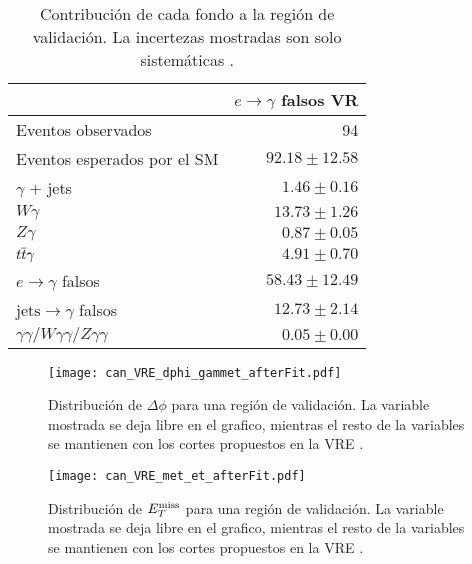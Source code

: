 \begin{table}
\centering
\caption{Contribución de cada fondo a la región de validación. La incertezas mostradas son solo sistemáticas \cite{drfran}.}
\begin{tabular}{lr}
\hline
 & $e\to\gamma$ falsos VR \\
\hline
Eventos observados & 94 \\
\hline
Eventos esperados por el SM & $92.18 \pm 12.58$ \\
\hline
$\gamma$ + jets & $1.46 \pm 0.16$ \\
$W\gamma$ & $13.73 \pm 1.26$ \\
$Z\gamma$ & $0.87 \pm 0.05$ \\
$t \overline{t}\gamma$ & $4.91 \pm 0.70$ \\
$e\rightarrow\gamma$ falsos & $58.43 \pm 12.49$ \\
$\text{jets}\rightarrow\gamma$ falsos & $12.73 \pm 2.14$ \\
$\gamma\gamma / W\gamma\gamma / Z\gamma\gamma$ & $0.05 \pm 0.00$ \\
\hline
\end{tabular}
\label{ta:vr_events}
\end{table}


\begin{figure}
\centering
\texttt{[image: can\_VRE\_dphi\_gammet\_afterFit.pdf]}
\caption{Distribución de $\Delta \phi$ para una región de validación. La variable mostrada se deja libre en el grafico, mientras el resto de la variables se mantienen con los cortes propuestos en la VRE \cite{drfran}.}
\label{VRE_dphi}
\end{figure}

\begin{figure}
\centering
\texttt{[image: can\_VRE\_met\_et\_afterFit.pdf]}
\caption{Distribución de $E_{T}^{\text{miss}}$ para una región de validación. La variable mostrada se deja libre en el grafico, mientras el resto de la variables se mantienen con los cortes propuestos en la VRE \cite{drfran}.}
\label{VRE_met_et}
\end{figure}
